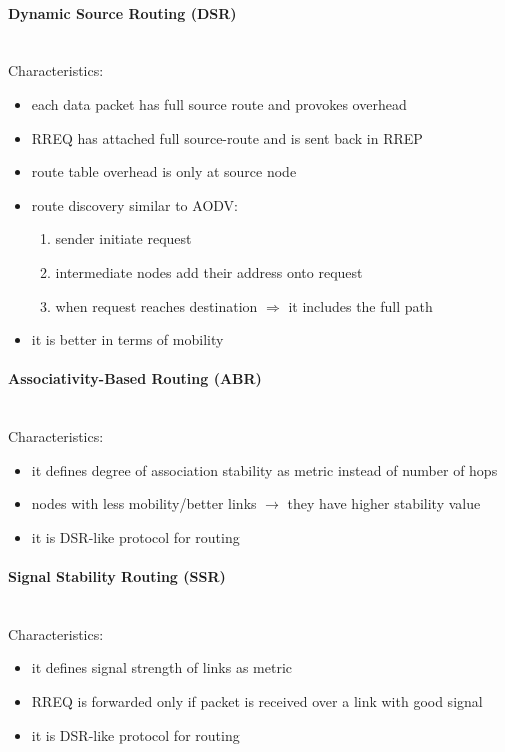 \paragraph{Dynamic Source Routing (DSR)}\mbox{}\\[0.2cm]
Characteristics:
\begin{itemize}
    \item each data packet has full source route and provokes overhead 
    \item RREQ has attached full source-route and is sent back in RREP
    \item route table overhead is only at source node 
    \item route discovery similar to AODV:
    \begin{enumerate}
        \item sender initiate request
        \item intermediate nodes add their address onto request
        \item when request reaches destination $\Rightarrow$ it includes the full path
    \end{enumerate}
    \item it is better in terms of mobility
\end{itemize}

\newpage

\paragraph{Associativity-Based Routing (ABR)}\mbox{}\\[0.2cm]
Characteristics:
\begin{itemize}
    \item it defines degree of association stability as metric instead of number of hops
    \item nodes with less mobility/better links $\rightarrow$ they have higher stability value
    \item it is DSR-like protocol for routing 
\end{itemize}

\paragraph{Signal Stability Routing (SSR)}\mbox{}\\[0.2cm]
Characteristics:
\begin{itemize}
    \item it defines signal strength of links as metric
    \item RREQ is forwarded only if packet is received over a link with good signal
    \item it is DSR-like protocol for routing
\end{itemize}

